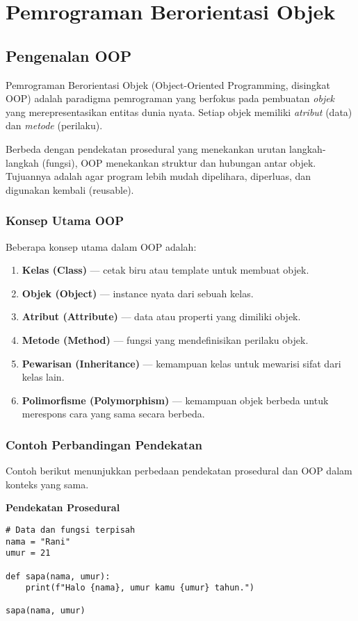 \chapter{Pemrograman Berorientasi Objek}

\section{Pengenalan OOP}

Pemrograman Berorientasi Objek (Object-Oriented Programming, disingkat OOP) adalah paradigma pemrograman yang berfokus pada pembuatan \emph{objek} yang merepresentasikan entitas dunia nyata. Setiap objek memiliki \emph{atribut} (data) dan \emph{metode} (perilaku).

Berbeda dengan pendekatan prosedural yang menekankan urutan langkah-langkah (fungsi), OOP menekankan struktur dan hubungan antar objek. Tujuannya adalah agar program lebih mudah dipelihara, diperluas, dan digunakan kembali (reusable).

\subsection*{Konsep Utama OOP}
Beberapa konsep utama dalam OOP adalah:
\begin{enumerate}
    \item \textbf{Kelas (Class)} — cetak biru atau template untuk membuat objek.
    \item \textbf{Objek (Object)} — instance nyata dari sebuah kelas.
    \item \textbf{Atribut (Attribute)} — data atau properti yang dimiliki objek.
    \item \textbf{Metode (Method)} — fungsi yang mendefinisikan perilaku objek.
    \item \textbf{Pewarisan (Inheritance)} — kemampuan kelas untuk mewarisi sifat dari kelas lain.
    \item \textbf{Polimorfisme (Polymorphism)} — kemampuan objek berbeda untuk merespons cara yang sama secara berbeda.
\end{enumerate}

\subsection*{Contoh Perbandingan Pendekatan}
Contoh berikut menunjukkan perbedaan pendekatan prosedural dan OOP dalam konteks yang sama.

\noindent\textbf{Pendekatan Prosedural}
\begin{lstlisting}[style=PythonStyle, caption={Pendekatan Prosedural}]
# Data dan fungsi terpisah
nama = "Rani"
umur = 21

def sapa(nama, umur):
    print(f"Halo {nama}, umur kamu {umur} tahun.")

sapa(nama, umur)
\end{lstlisting}

